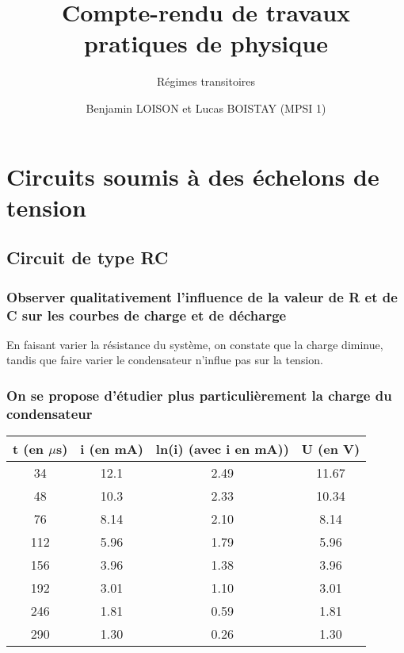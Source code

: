 \documentclass{scrartcl}
\begin{document}
	\title{\vspace{-2cm}Compte-rendu de travaux pratiques de physique}
	\subtitle{Régimes transitoires}
	\author{Benjamin LOISON et Lucas BOISTAY (MPSI 1)}
	\date{}
	\maketitle

	\section{Circuits soumis à des échelons de tension}

		\subsection{Circuit de type RC}
		
			\subsubsection{Observer qualitativement l'influence de la valeur de R et de C sur les courbes de charge et de décharge}
			
				En faisant varier la résistance du système, on constate que la charge diminue, tandis que faire varier le condensateur n'influe pas sur la tension.
				
			\subsubsection{On se propose d'étudier plus particulièrement la charge du condensateur}
			
			
				\begin{tabular}{|c|c|c|c|}%
					\hline t (en $\mu$s) & i (en mA) & ln(i) (avec i en mA))& U (en V)\\
					\hline 34 & 12.1 & 2.49 & 11.67\\ %
					\hline 48 & 10.3 & 2.33 & 10.34\\ %
					\hline 76 & 8.14 & 2.10 & 8.14\\ %
					\hline 112 & 5.96 & 1.79 & 5.96\\ %
					\hline 156 & 3.96 & 1.38 & 3.96\\ %
					\hline 192 & 3.01 & 1.10 & 3.01\\ %
					\hline 246 & 1.81 & 0.59 & 1.81\\ %
					\hline 290 & 1.30 & 0.26 & 1.30\\ %
					\hline
				\end{tabular}\\\\
			
\end{document}
